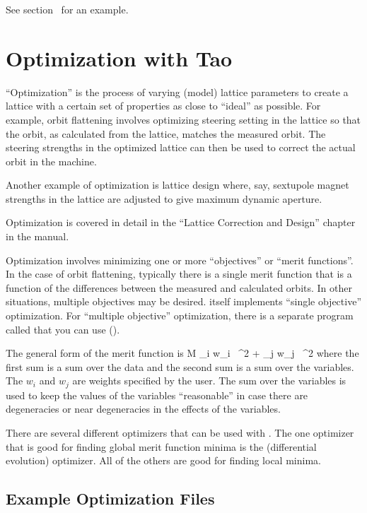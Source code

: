 \documentclass{hitec}
\newcommand{\Section}[1]{\section{#1}\vspace*{-1ex}}
\begin{document}
See section~ for an example.

\newpage

\Section{Optimization with Tao}
\label{s:optimization}

``Optimization'' is the process of varying (model) lattice parameters to create a lattice with a
certain set of properties as close to ``ideal'' as possible. For example, orbit flattening involves
optimizing steering setting in the lattice so that the orbit, as calculated from the lattice,
matches the measured orbit. The steering strengths in the optimized lattice can then be used to
correct the actual orbit in the machine.

Another example of optimization is lattice design where, say, sextupole magnet strengths in the
lattice are adjusted to give maximum dynamic aperture.

Optimization is covered in detail in the ``Lattice Correction and Design'' chapter in the \tao manual.


Optimization involves minimizing one or more ``objectives'' or ``merit functions''. In the case of
orbit flattening, typically there is a single merit function that is a function of the differences
between the measured and calculated orbits. In other situations, multiple objectives may
be desired. \tao itself implements ``single objective'' optimization. For ``multiple objective''
optimization, there is a separate program called  that you can use ().

The general form of the merit function  is
\Begineq
  {\cal M} \equiv 
    \sum_{i} w_i \, ^2 + 
    \sum_{j} w_j \, ^2
  \label{m1}
\Endeq
where the first sum is a sum over the data and the second sum is a sum over the variables. The
$w_i$ and $w_j$ are weights specified by the user. The sum over the variables is used to keep the
values of the variables ``reasonable'' in case there are degeneracies or near degeneracies in the
effects of the variables.

There are several different optimizers that can be used with \tao. The one optimizer that is good
for finding global merit function minima is the  (differential evolution) optimizer. All of
the others are good for finding local minima.

\subsection{Example Optimization Files}
\label{s:opt.files}
\end{document}
